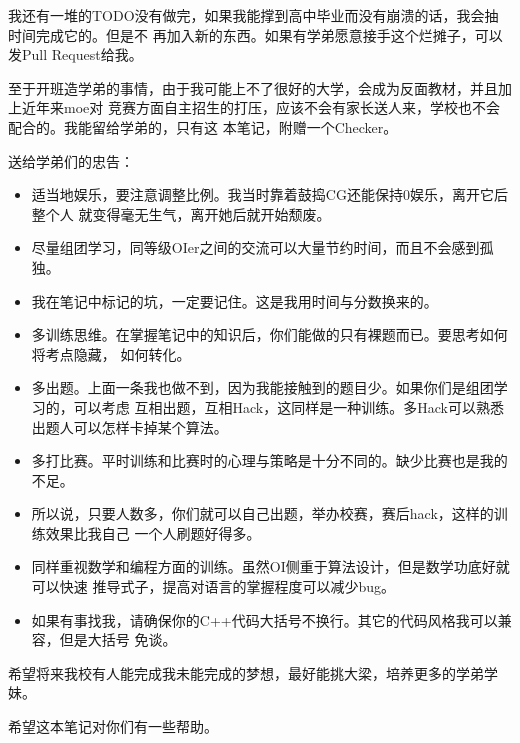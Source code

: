 我还有一堆的TODO没有做完，如果我能撑到高中毕业而没有崩溃的话，我会抽时间完成它的。但是不
再加入新的东西。如果有学弟愿意接手这个烂摊子，可以发Pull Request给我。

至于开班造学弟的事情，由于我可能上不了很好的大学，会成为反面教材，并且加上近年来moe对
竞赛方面自主招生的打压，应该不会有家长送人来，学校也不会配合的。我能留给学弟的，只有这
本笔记，附赠一个Checker。

送给学弟们的忠告：
\begin{itemize}
    \item 适当地娱乐，要注意调整比例。我当时靠着鼓捣CG还能保持0娱乐，离开它后整个人
    就变得毫无生气，离开她后就开始颓废。
    \item 尽量组团学习，同等级OIer之间的交流可以大量节约时间，而且不会感到孤独。
    \item 我在笔记中标记的坑，一定要记住。这是我用时间与分数换来的。
    \item 多训练思维。在掌握笔记中的知识后，你们能做的只有裸题而已。要思考如何将考点隐藏，
    如何转化。
    \item 多出题。上面一条我也做不到，因为我能接触到的题目少。如果你们是组团学习的，可以考虑
    互相出题，互相Hack，这同样是一种训练。多Hack可以熟悉出题人可以怎样卡掉某个算法。
    \item 多打比赛。平时训练和比赛时的心理与策略是十分不同的。缺少比赛也是我的不足。
    \item 所以说，只要人数多，你们就可以自己出题，举办校赛，赛后hack，这样的训练效果比我自己
    一个人刷题好得多。
    \item 同样重视数学和编程方面的训练。虽然OI侧重于算法设计，但是数学功底好就可以快速
    推导式子，提高对语言的掌握程度可以减少bug。
    \item 如果有事找我，请确保你的C++代码大括号不换行。其它的代码风格我可以兼容，但是大括号
    免谈。
\end{itemize}

希望将来我校有人能完成我未能完成的梦想，最好能挑大梁，培养更多的学弟学妹。

希望这本笔记对你们有一些帮助。

